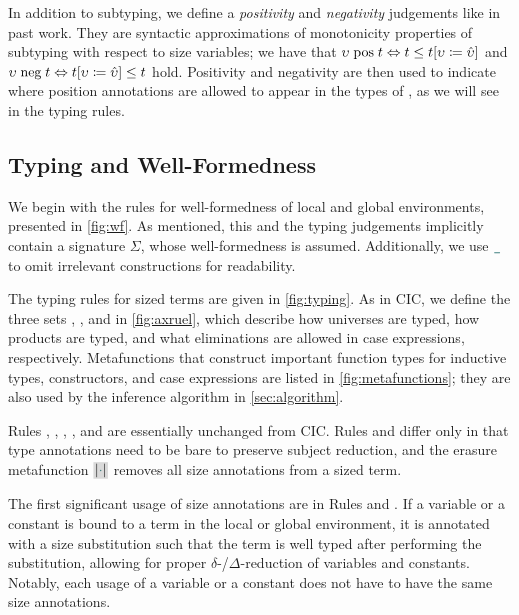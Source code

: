 

In addition to subtyping, we define a \textit{positivity} and \textit{negativity} judgements like in past work.
They are syntactic approximations of monotonicity properties of subtyping with respect to size variables;
we have that
$\upsilon \mathrel{\text{pos}} t \Leftrightarrow t \leq t [\upsilon \coloneqq \hat{\upsilon}]$ and
$\upsilon \mathrel{\text{neg}} t \Leftrightarrow t [\upsilon \coloneqq \hat{\upsilon}] \leq t$ hold.
Positivity and negativity are then used to indicate where position annotations are allowed to appear in the types of \cofixpoints,
as we will see in the typing rules.

\subsection{Typing and Well-Formedness}\label{sec:typing:rules}



We begin with the rules for well-formedness of local and global environments, presented in \autoref{fig:wf}.
As mentioned, this and the typing judgements implicitly contain a signature $\Sigma$, whose well-formedness is assumed.
Additionally, we use $\any$ to omit irrelevant constructions for readability.







The typing rules for sized terms are given in \autoref{fig:typing}. As in CIC, we define the three sets \Axioms, \Rules, and \Elims in \autoref{fig:axruel}, which describe how universes are typed, how products are typed, and what eliminations are allowed in case expressions, respectively.
Metafunctions that construct important function types for inductive types, constructors, and case expressions are listed in \autoref{fig:metafunctions}; they are also used by the inference algorithm in \autoref{sec:algorithm}.

Rules , , ,  , and  are essentially unchanged from CIC.
Rules  and  differ only in that type annotations need to be bare to preserve subject reduction,
and the erasure metafunction $\new{\erase{\ph}}$ removes all size annotations from a sized term.

The first significant usage of size annotations are in Rules  and .
If a variable or a constant is bound to a term in the local or global environment, it is annotated with a size substitution such that the term is well typed after performing the substitution, allowing for proper $\delta$-/$\Delta$-reduction of variables and constants.
Notably, each usage of a variable or a constant does not have to have the same size annotations.

